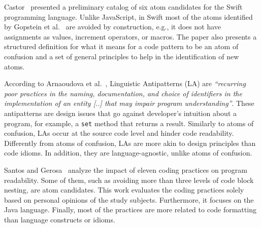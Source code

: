 Castor~\cite{castor2018} presented a preliminary catalog of six atom candidates for the Swift programming language. Unlike JavaScript, in Swift most of the atoms identified by Gopstein et al.~\cite{DBLP:conf/sigsoft/GopsteinIYDZYC17} are avoided by construction, e.g., it does not have assignments as values, increment operators, or macros. The paper also presents a structured definition for what it means for a code pattern to be an atom of confusion and a set of general principles to help in the identification of new atoms. 


According to Arnaoudova et al.~\cite{Arnaoudova:2016:LAW}, Linguistic Antipatterns (LA) are \textit{``recurring poor practices in the naming, documentation, and choice of identifiers in the implementation of an entity [..] that may impair program understanding''}. These antipatterns are design issues that go against developer's  intuition about a program, for example, a \texttt{set} method that returns a result. Similarly to atoms of confusion, LAs occur at the source code level and hinder code readability. Differently from atoms of confusion, LAs are more akin to design principles than code idioms. In addition, they are language-agnostic, unlike atoms of confusion.

Santos and Gerosa~\cite{Santos:2018:ICP} analyze the impact of eleven coding practices on program readability. Some of them, such as avoiding more than three levels of code
block nesting, are atom candidates. This work evaluates the coding practices solely based on personal opinions of the study subjects. Furthermore, it focuses on the Java language. Finally, most of the practices are more related to code formatting than language constructs or idioms.

